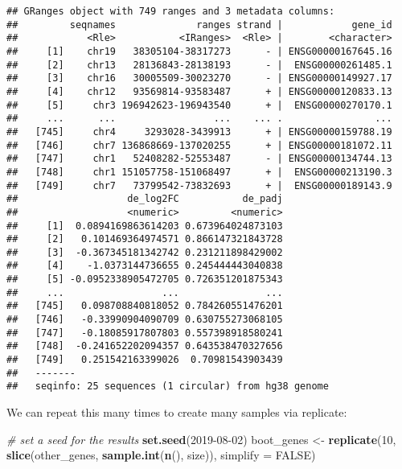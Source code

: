 \documentclass[
  9pt,
  a4paper,
]{extarticle}
\newenvironment{Shaded}{\begin{snugshade}}{\end{snugshade}}
\newcommand{\CommentTok}[1]{\textcolor[rgb]{0.56,0.35,0.01}{\textit{#1}}}
\newcommand{\DataTypeTok}[1]{\textcolor[rgb]{0.13,0.29,0.53}{#1}}
\newcommand{\DecValTok}[1]{\textcolor[rgb]{0.00,0.00,0.81}{#1}}
\newcommand{\KeywordTok}[1]{\textcolor[rgb]{0.13,0.29,0.53}{\textbf{#1}}}
\newcommand{\NormalTok}[1]{#1}
\newcommand{\OtherTok}[1]{\textcolor[rgb]{0.56,0.35,0.01}{#1}}
\newcommand{\StringTok}[1]{\textcolor[rgb]{0.31,0.60,0.02}{#1}}
\begin{document}
\begin{verbatim}
## GRanges object with 749 ranges and 3 metadata columns:
##         seqnames              ranges strand |            gene_id
##            <Rle>           <IRanges>  <Rle> |        <character>
##     [1]    chr19   38305104-38317273      - | ENSG00000167645.16
##     [2]    chr13   28136843-28138193      - |  ENSG00000261485.1
##     [3]    chr16   30005509-30023270      - | ENSG00000149927.17
##     [4]    chr12   93569814-93583487      + | ENSG00000120833.13
##     [5]     chr3 196942623-196943540      + |  ENSG00000270170.1
##     ...      ...                 ...    ... .                ...
##   [745]     chr4     3293028-3439913      + | ENSG00000159788.19
##   [746]     chr7 136868669-137020255      + | ENSG00000181072.11
##   [747]     chr1   52408282-52553487      - | ENSG00000134744.13
##   [748]     chr1 151057758-151068497      + |  ENSG00000213190.3
##   [749]     chr7   73799542-73832693      + |  ENSG00000189143.9
##                   de_log2FC           de_padj
##                   <numeric>         <numeric>
##     [1]  0.0894169863614203 0.673964024873103
##     [2]   0.101469364974571 0.866147321843728
##     [3]  -0.367345181342742 0.231211898429002
##     [4]    -1.0373144736655 0.245444443040838
##     [5] -0.0952338905472705 0.726351201875343
##     ...                 ...               ...
##   [745]   0.098708840818052 0.784260551476201
##   [746]   -0.33990904090709 0.630755273068105
##   [747]   -0.18085917807803 0.557398918580241
##   [748]  -0.241652202094357 0.643538470327656
##   [749]   0.251542163399026  0.70981543903439
##   -------
##   seqinfo: 25 sequences (1 circular) from hg38 genome
\end{verbatim}

We can repeat this many times to create many samples via replicate:

\begin{Shaded}
\begin{Highlighting}[]
\CommentTok{# set a seed for the results}
\KeywordTok{set.seed}\NormalTok{(}\DecValTok{2019-08-02}\NormalTok{)}
\NormalTok{boot_genes <-}\StringTok{ }\KeywordTok{replicate}\NormalTok{(}\DecValTok{10}\NormalTok{,}
                        \KeywordTok{slice}\NormalTok{(other_genes, }\KeywordTok{sample.int}\NormalTok{(}\KeywordTok{n}\NormalTok{(), size)),}
                        \DataTypeTok{simplify =} \OtherTok{FALSE}\NormalTok{)}
\end{Highlighting}
\end{Shaded}
\end{document}
